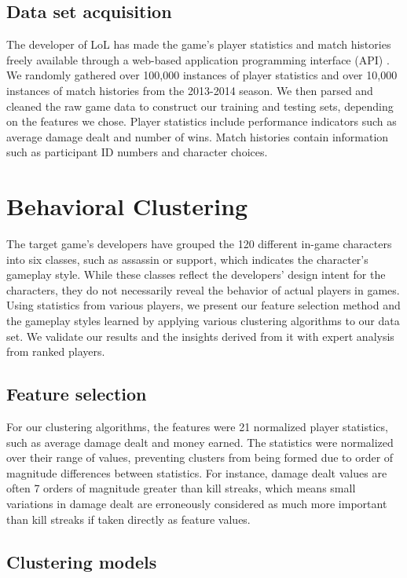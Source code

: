 \documentclass[letterpaper,10 pt,conference]{ieeeconf}
\begin{document}
\subsection{Data set acquisition}

The developer of LoL has made the game's player statistics and match histories freely available through a web-based application programming interface (API) \cite{Rio:14}. We randomly gathered over 100,000 instances of player statistics and over 10,000 instances of match histories from the 2013-2014 season. We then parsed and cleaned the raw game data to construct our training and testing sets, depending on the features we chose. Player statistics include performance indicators such as average damage dealt and number of wins. Match histories contain information such as participant ID numbers and character choices.

\section{Behavioral Clustering}

The target game's developers have grouped the 120 different in-game characters into six classes, such as assassin or support, which indicates the character's gameplay style. While these classes reflect the developers' design intent for the characters, they do not necessarily reveal the behavior of actual players in games. Using statistics from various players, we present our feature selection method and the gameplay styles learned by applying various clustering algorithms to our data set. We validate our results and the insights derived from it with expert analysis from ranked players.

\subsection{Feature selection}

For our clustering algorithms, the features were 21 normalized player statistics, such as average damage dealt and money earned. The statistics were normalized over their range of values, preventing clusters from being formed due to order of magnitude differences between statistics. For instance, damage dealt values are often 7 orders of magnitude greater than kill streaks, which means small variations in damage dealt are erroneously considered as much more important than kill streaks if taken directly as feature values. 

\subsection{Clustering models}
\end{document}
